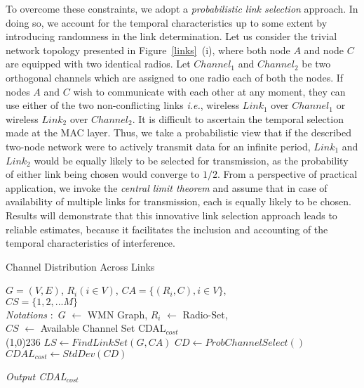 \documentclass[conference]{IEEEtran}
\begin{document}
To overcome these constraints, we adopt a \textit{probabilistic link selection} approach. In doing so, we account for the temporal characteristics up to some extent by introducing randomness in the link determination. Let us consider the trivial network topology presented in Figure~\ref{links}~(i), where both node $A$ and node $C$ are equipped with two identical radios. Let $Channel_1$ and $Channel_2$ be two orthogonal channels which are assigned to one radio each of both the nodes. If nodes $A$ and $C$ wish to communicate with each other at any moment, they can use either of the two non-conflicting links \emph{i.e.}, wireless $Link_1$ over $Channel_1$ or wireless $Link_2$ over $Channel_2$. It is difficult to ascertain the temporal selection made at the MAC layer. Thus, we take a probabilistic view  that if the described two-node network were to actively transmit data for an infinite period, $Link_1$ and $Link_2$ would be equally likely to be selected for transmission, as the probability of either link being 
chosen would converge to $1/2$. From a perspective of practical application, we invoke the \textit{central limit theorem} and assume that in case of availability of multiple links for transmission, each is equally likely to be chosen. Results will demonstrate that this innovative link selection approach leads to reliable estimates, because it facilitates the inclusion and accounting of the temporal characteristics of interference. 

\renewcommand{\algorithmicrequire}{\textbf{Input:}}
\renewcommand{\algorithmicensure}{\textbf{Output:}}
\begin{algorithm}[htb!] 
\caption{Channel Distribution Across Links}
\label{CDAL}
\begin{algorithmic}[1]
{\fontsize{9}{10}
\REQUIRE $G = (V,E)$, $R_i (i \in V)$, $CA = \{(R_i,C), i \in V\}$,\\ $CS =\{1, 2,...M\}$ \\
\textit{Notations} $:$ $G$ $\leftarrow$  WMN Graph, $R_i$ $\leftarrow$ Radio-Set,\\
		   $CS$ $\leftarrow$ Available Channel Set
\ENSURE CDAL$_{cost}$ \\
\line(1,0){236}
\STATE $LS \leftarrow FindLinkSet(G,CA)$ 
\STATE $CD \leftarrow ProbChannelSelect()$ 
\STATE $CDAL_{cost}\leftarrow StdDev(CD)$

\STATE \textit{Output CDAL$_{cost}$} 
}
\end{algorithmic}
\end{algorithm}
\end{document}

